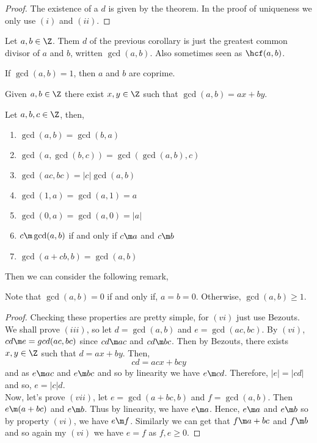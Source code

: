 \begin{proof}
  The existence of a $d$ is given by the theorem. In the proof of uniqueness we only use $(i)$ and $(ii)$.
\end{proof}

\begin{ndefi}
  Let $a, b \in \Z$. Them $d$ of the previous corollary is just the greatest common divisor of $a$ and $b$, written $\gcd (a, b)$. Also sometimes seen as $\hcf (a, b)$.
\end{ndefi}

If $\gcd(a, b) = 1$, then $a$ and $b$ are coprime.

\begin{identity}
  Given $a, b \in \Z$ there exist $x, y \in \Z$ such that $\gcd(a, b) = ax + by$.
\end{identity}

\begin{nprop}
  Let $a, b, c \in \Z$, then,
  \begin{enumerate}
    \item $\gcd(a, b) = \gcd(b, a)$
    \item $\gcd(a, \gcd(b, c)) = \gcd(\gcd(a, b), c)$
    \item $\gcd(ac, bc) = |c|\gcd(a, b)$
    \item $\gcd(1, a) = \gcd(a, 1) = a$
    \item $\gcd(0, a) = \gcd(a, 0) = |a|$
    \item $c \m \gcd(a, b)$ if and only if $c \m a$ and $c \m b$
    \item $\gcd(a + cb, b) = \gcd(a, b)$
  \end{enumerate}
\end{nprop}

Then we can consider the following remark,
\begin{remark}
   Note that $\gcd(a, b) = 0$ if and only if, $a = b = 0$. Otherwise, $\gcd(a, b) \ge 1$.
\end{remark}

\begin{proof}
  Checking these properties are pretty simple, for $(vi)$ just use Bezouts. \\

  We shall prove $(iii)$, so let $d = \gcd(a, b)$ and $e = \gcd(ac, bc)$. By $(vi)$, $cd \m e = gcd(ac, bc)$ since $cd \m ac$ and $cd \m bc$. Then by Bezouts, there exists $x, y \in \Z$ such that $d = ax + by$. Then,
  $$ cd = acx + bcy $$
  and as $e \m ac$ and $e \m bc$ and so by linearity we have $e \m cd$. Therefore, $|e| = |cd|$ and so, $e = |c|d$.\\

  Now, let's prove $(vii)$, let $e = \gcd(a + bc, b)$ and $f = \gcd(a, b)$. Then $e \m (a + bc)$ and $e \m b$. Thus by linearity, we have $e \m a$. Hence, $e \m a$ and $e \m b$ so by property $(vi)$, we have $e \m f$. Similarly we can get that $f \m a + bc$ and $f \m b$ and so again my $(vi)$ we have $e = f$ as $f, e \ge 0$.
\end{proof}

